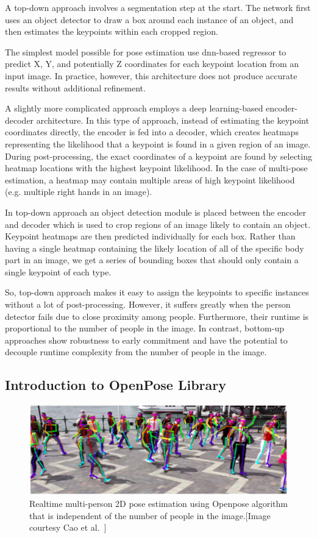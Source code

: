 A top-down approach involves a segmentation step at the start. The network first uses an object detector to draw a box around each instance of an object, and then estimates the keypoints within each cropped region. 

The simplest model possible for pose estimation use \gls{dnn}-based regressor to predict X, Y, and potentially Z coordinates for each keypoint location from an input image. In practice, however, this architecture does not produce accurate results without additional refinement. 

A slightly more complicated approach employs a deep learning-based encoder-decoder architecture. In this type of approach, instead of estimating the keypoint coordinates directly, the encoder is fed into a decoder, which creates heatmaps representing the likelihood that a keypoint is found in a given region of an image. During post-processing, the exact coordinates of a keypoint are found by selecting heatmap locations with the highest keypoint likelihood. In the case of multi-pose estimation, a heatmap may contain multiple areas of high keypoint likelihood (e.g. multiple right hands in an image). 

In top-down approach an object detection module is placed between the encoder and decoder which is used to crop regions of an image likely to contain an object. Keypoint heatmaps are then predicted individually for each box. Rather than having a single heatmap containing the likely location of all of the specific body part in an image, we get a series of bounding boxes that should only contain a single keypoint of each type. 

So, top-down approach makes it easy to assign the keypoints to specific instances without a lot of post-processing. However, it suffers greatly when the person detector fails due to close proximity among people. Furthermore, their runtime is proportional to the number of people in the image. In contrast, bottom-up approaches show robustness to early commitment and have the potential to decouple runtime complexity from the number of people in the image.


\subsection{Introduction to OpenPose Library} 
\begin{figure}
	\centering
	\includegraphics[width=\textwidth]{figures/openpose_demo.eps}
	\caption[Realtime multi-person 2D pose estimation using Openpose algorithm]
	{Realtime multi-person 2D pose estimation using Openpose algorithm that is independent of the number of people in the image.[Image courtesy Cao et al.~\cite{Cao_19}] \label{fig:openpose_demo}}
\end{figure}

